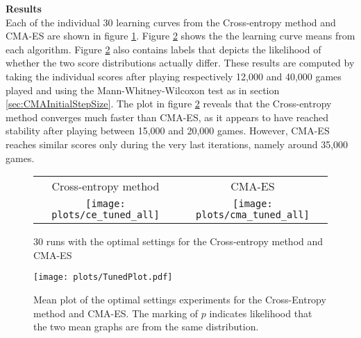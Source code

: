 \textbf{Results}\\
Each of the individual 30 learning curves from the Cross-entropy method
and CMA-ES are shown in figure \ref{fig:tunedAll}. Figure \ref{fig:TunedMean} shows the the
learning curve means from each algorithm. Figure \ref{fig:TunedMean} also contains 
labels that depicts the likelihood of whether the two score distributions actually differ.
These results are computed by taking the individual scores after playing respectively 
12,000 and 40,000 games played and using the Mann-Whitney-Wilcoxon test
as in section \ref{sec:CMAInitialStepSize}. The plot in figure \ref{fig:TunedMean}
reveals that the Cross-entropy method converges much faster than CMA-ES, as it 
appears to have reached stability after playing between 15,000 and 20,000 games. However,
CMA-ES reaches similar scores only during the very last iterations, namely around 35,000 games.
\begin{figure}[H]
\begin{tabular}{@{}c@{}c@{}}
Cross-entropy method & CMA-ES\\
\texttt{[image: plots/ce\_tuned\_all]} &
\texttt{[image: plots/cma\_tuned\_all]}
\end{tabular}
\caption{30 runs with the optimal settings for the Cross-entropy method and CMA-ES \label{fig:tunedAll}}
\end{figure}

\begin{figure}[H]
\centering
\texttt{[image: plots/TunedPlot.pdf]}
\caption{Mean plot of the optimal settings experiments for the Cross-Entropy method and CMA-ES. 
The marking of $p$ indicates likelihood that the two mean graphs are from the same 
distribution.\label{fig:TunedMean}}
\end{figure}

